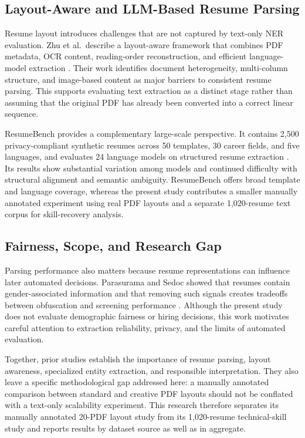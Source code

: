 \documentclass[conference]{IEEEtran}
\begin{document}
\subsection{Layout-Aware and LLM-Based Resume Parsing}

Resume layout introduces challenges that are not captured by text-only NER evaluation. Zhu et al.\ describe a layout-aware framework that combines PDF metadata, OCR content, reading-order reconstruction, and efficient language-model extraction \cite{zhu2025layout}. Their work identifies document heterogeneity, multi-column structure, and image-based content as major barriers to consistent resume parsing. This supports evaluating text extraction as a distinct stage rather than assuming that the original PDF has already been converted into a correct linear sequence.

ResumeBench provides a complementary large-scale perspective. It contains 2,500 privacy-compliant synthetic resumes across 50 templates, 30 career fields, and five languages, and evaluates 24 language models on structured resume extraction \cite{ling2025resumebench}. Its results show substantial variation among models and continued difficulty with structural alignment and semantic ambiguity. ResumeBench offers broad template and language coverage, whereas the present study contributes a smaller manually annotated experiment using real PDF layouts and a separate 1,020-resume text corpus for skill-recovery analysis.

\subsection{Fairness, Scope, and Research Gap}

Parsing performance also matters because resume representations can influence later automated decisions. Parasurama and Sedoc showed that resumes contain gender-associated information and that removing such signals creates tradeoffs between obfuscation and screening performance \cite{parasurama2021}. Although the present study does not evaluate demographic fairness or hiring decisions, this work motivates careful attention to extraction reliability, privacy, and the limits of automated evaluation.

Together, prior studies establish the importance of resume parsing, layout awareness, specialized entity extraction, and responsible interpretation. They also leave a specific methodological gap addressed here: a manually annotated comparison between standard and creative PDF layouts should not be conflated with a text-only scalability experiment. This research therefore separates its manually annotated 20-PDF layout study from its 1,020-resume technical-skill study and reports results by dataset source as well as in aggregate.
\end{document}
